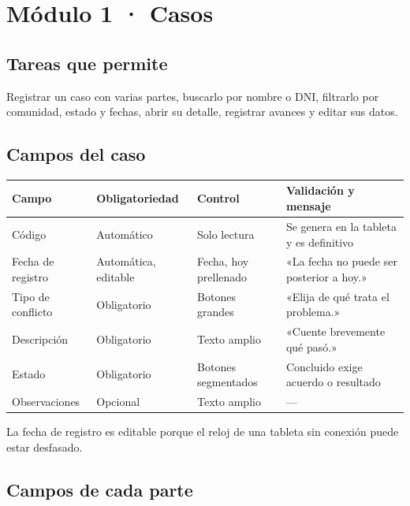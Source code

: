 \documentclass[11pt,a4paper]{article}
\begin{document}


\section{Módulo 1 · Casos}

\subsection{Tareas que permite}

Registrar un caso con varias partes, buscarlo por nombre o DNI, filtrarlo por comunidad, estado y fechas, abrir su detalle, registrar avances y editar sus datos.

\subsection{Campos del caso}

\begin{center}
\small
\begin{tabular}{@{}p{2.6cm}p{2.4cm}p{3.0cm}p{6.4cm}@{}}
\toprule
\textbf{Campo} & \textbf{Obligatoriedad} & \textbf{Control} & \textbf{Validación y mensaje} \\
\midrule
Código & Automático & Solo lectura & Se genera en la tableta y es definitivo \\
Fecha de registro & Automática, editable & Fecha, hoy prellenado & «La fecha no puede ser posterior a hoy.» \\
Tipo de conflicto & Obligatorio & Botones grandes & «Elija de qué trata el problema.» \\
Descripción & Obligatorio & Texto amplio & «Cuente brevemente qué pasó.» \\
Estado & Obligatorio & Botones segmentados & Concluido exige acuerdo o resultado \\
Observaciones & Opcional & Texto amplio & --- \\
\bottomrule
\end{tabular}
\end{center}

La fecha de registro es editable porque el reloj de una tableta sin conexión puede estar desfasado.

\subsection{Campos de cada parte}
\end{document}
